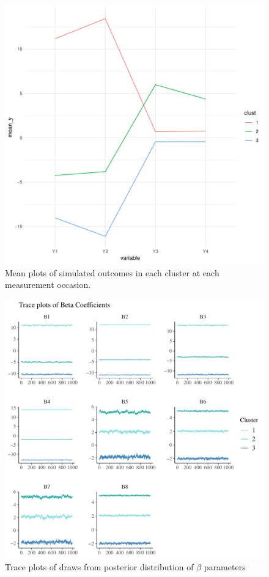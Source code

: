 \documentclass{article}
\begin{document}
\begin{figure}[h]
	\label{fig:sim1_means}
	\caption{Mean plots of simulated outcomes in each cluster at each measurement occasion.}
	\centering
	\includegraphics[width = 1\textwidth]{y_means.pdf}
\end{figure}

\begin{figure}
	\label{fig:sim1_beta_trace}
	\caption{Trace plots of draws from posterior distribution of $\beta$ parameters}
	\centering
	\includegraphics[width = 1\textwidth]{beta_trace.pdf}
\end{figure}	
\end{document}
